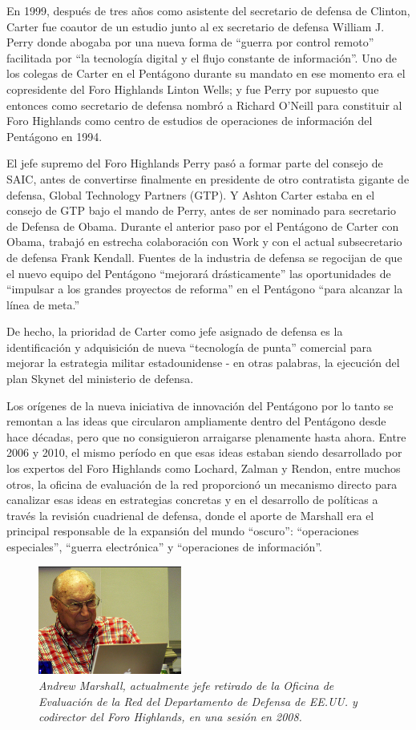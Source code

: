 \documentclass[10pt,a5paper,twoside,spanish,]{book}
\begin{document}
En 1999, después de tres años como asistente del secretario de defensa
de Clinton, Carter fue coautor de un estudio junto al ex secretario de
defensa William J. Perry donde abogaba por una nueva forma de ``guerra
por control remoto'' facilitada por ``la tecnología digital y el flujo
constante de información''. Uno de los colegas de Carter en el Pentágono
durante su mandato en ese momento era el copresidente del Foro Highlands
Linton Wells; y fue Perry por supuesto que entonces como secretario de
defensa nombró a Richard O'Neill para constituir al Foro Highlands como
centro de estudios de operaciones de información del Pentágono en 1994.

El jefe supremo del Foro Highlands Perry pasó a formar parte del consejo
de SAIC, antes de convertirse finalmente en presidente de otro
contratista gigante de defensa, Global Technology Partners (GTP). Y
Ashton Carter estaba en el consejo de GTP bajo el mando de Perry, antes
de ser nominado para secretario de Defensa de Obama. Durante el anterior
paso por el Pentágono de Carter con Obama, trabajó en estrecha
colaboración con Work y con el actual subsecretario de defensa Frank
Kendall. Fuentes de la industria de defensa se regocijan de que el nuevo
equipo del Pentágono ``mejorará drásticamente'' las oportunidades de
``impulsar a los grandes proyectos de reforma'' en el Pentágono ``para
alcanzar la línea de meta.''

De hecho, la prioridad de Carter como jefe asignado de defensa es la
identificación y adquisición de nueva ``tecnología de punta'' comercial
para mejorar la estrategia militar estadounidense - en otras palabras,
la ejecución del plan Skynet del ministerio de defensa.

Los orígenes de la nueva iniciativa de innovación del Pentágono por lo
tanto se remontan a las ideas que circularon ampliamente dentro del
Pentágono desde hace décadas, pero que no consiguieron arraigarse
plenamente hasta ahora. Entre 2006 y 2010, el mismo período en que esas
ideas estaban siendo desarrollado por los expertos del Foro Highlands
como Lochard, Zalman y Rendon, entre muchos otros, la oficina de
evaluación de la red proporcionó un mecanismo directo para canalizar
esas ideas en estrategias concretas y en el desarrollo de políticas a
través la revisión cuadrienal de defensa, donde el aporte de Marshall
era el principal responsable de la expansión del mundo ``oscuro'':
``operaciones especiales'', ``guerra electrónica'' y ``operaciones de
información''.

\begin{figure}[htbp]
\centering
\includegraphics{2.9.png}
\caption{\emph{Andrew Marshall, actualmente jefe retirado de la Oficina
de Evaluación de la Red del Departamento de Defensa de EE.UU. y
codirector del Foro Highlands, en una sesión en 2008.}}
\end{figure}
\end{document}
